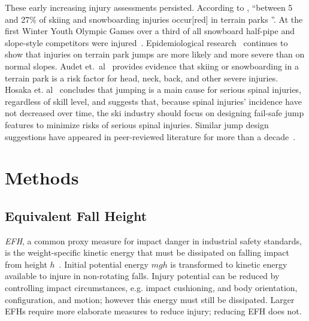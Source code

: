 \documentclass{article}
\begin{document}
These early increasing injury assessments persisted. According to
\cite{Russell2014}, ``between 5 and 27\% of skiing and snowboarding injuries
occur[red] in terrain parks
\cite{Bridges2003,Goulet2007,Moffat2009,Greve2009,Brooks2010,Ruedl2013}''.  At
the first Winter Youth Olympic Games over a third of all snowboard half-pipe
and slope-style competitors were injured~\cite{Ruedl2012}.  Epidemiological
research~\cite{Carus2016,Audet2020,Hosaka2020} continues to show that injuries
on terrain park jumps are more likely and more severe than on normal slopes.
Audet et.~al~\cite{Audet2020} provides evidence that skiing or snowboarding in
a terrain park is a risk factor for head, neck, back, and other severe
injuries. Hosaka et. al~\cite{Hosaka2020} concludes that jumping is a main
cause for serious spinal injuries, regardless of skill level, and suggests
that, because spinal injuries' incidence  have not decreased over time, the ski
industry should focus on designing fail-safe jump features to minimize risks of
serious spinal injuries. Similar jump design suggestions have appeared in
peer-reviewed literature for more than a
decade~\cite{Hubbard2009,Swedberg2012,Hubbard2012,McNeil2012,McNeil2012a,Hubbard2015,Levy2015,Petrone2017,Moore2018}.

\section{Methods}
\subsection{Equivalent Fall Height}
\label{sec:efh}
%
\emph{EFH}, a common proxy measure for impact danger in industrial safety
standards, is the weight-specific kinetic energy that must be dissipated on
falling impact from height $h$~\cite{Muller1995,Hubbard2009,Gasser2018}.
Initial potential energy $mgh$ is transformed to kinetic energy available to
injure in non-rotating falls. Injury potential can be reduced by controlling
impact circumstances, e.g. impact cushioning, and body orientation,
configuration, and motion; however this energy must still be dissipated. Larger
EFHs require more elaborate measures to reduce injury; reducing EFH does not.
\end{document}
